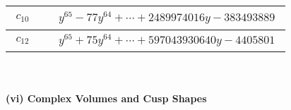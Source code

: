 \documentclass[1p]{elsarticle_modified}
\theoremstyle{definition}
\begin{document}
\begin{tabular}{m{50pt}|m{274pt}}
\hline $$\begin{aligned}c_{10}\end{aligned}$$&$\begin{aligned}
&y^{65}-77 y^{64}+\cdots+2489974016 y-383493889
\end{aligned}$\\
\hline $$\begin{aligned}c_{12}\end{aligned}$$&$\begin{aligned}
&y^{65}+75 y^{64}+\cdots+597043930640 y-4405801
\end{aligned}$\\
\hline
\end{tabular}\\~\\
\newpage\flushleft \textbf{(vi) Complex Volumes and Cusp Shapes}
\end{document}
